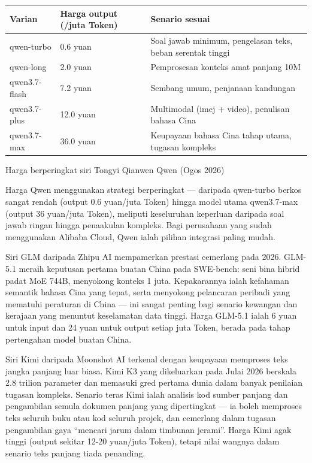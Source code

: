 \begin{center}
\begin{tabularx}{\linewidth}{|X|X|X|}
\hline
\textbf{Varian} & \textbf{Harga output (/juta Token)} & \textbf{Senario sesuai} \tabularnewline
\hline
qwen-turbo & 0.6 yuan & Soal jawab minimum, pengelasan teks, beban serentak tinggi \tabularnewline
qwen-long & 2.0 yuan & Pemprosesan konteks amat panjang 10M \tabularnewline
qwen3.7-flash & 7.2 yuan & Sembang umum, penjanaan kandungan \tabularnewline
qwen3.7-plus & 12.0 yuan & Multimodal (imej + video), penulisan bahasa Cina \tabularnewline
qwen3.7-max & 36.0 yuan & Keupayaan bahasa Cina tahap utama, tugasan kompleks \tabularnewline
\hline
\end{tabularx}
\end{center}

\begin{center}\small\color{gray}Harga berperingkat siri Tongyi Qianwen Qwen (Ogos 2026)\end{center}

Harga Qwen menggunakan strategi berperingkat — daripada qwen-turbo berkos sangat rendah (output 0.6 yuan/juta Token) hingga model utama qwen3.7-max (output 36 yuan/juta Token), meliputi keseluruhan keperluan daripada soal jawab ringan hingga penaakulan kompleks. Bagi perusahaan yang sudah menggunakan Alibaba Cloud, Qwen ialah pilihan integrasi paling mudah.


Siri GLM daripada Zhipu AI mempamerkan prestasi cemerlang pada 2026. GLM-5.1 meraih keputusan pertama buatan China pada SWE-bench: seni bina hibrid padat MoE 744B, menyokong konteks 1 juta. Kepakarannya ialah kefahaman semantik bahasa Cina yang tepat, serta menyokong pelancaran peribadi yang mematuhi peraturan di China — ini sangat penting bagi senario kewangan dan kerajaan yang menuntut keselamatan data tinggi. Harga GLM-5.1 ialah 6 yuan untuk input dan 24 yuan untuk output setiap juta Token, berada pada tahap pertengahan model buatan China.


Siri Kimi daripada Moonshot AI terkenal dengan keupayaan memproses teks jangka panjang luar biasa. Kimi K3 yang dikeluarkan pada Julai 2026 berskala 2.8 trilion parameter dan memasuki gred pertama dunia dalam banyak penilaian tugasan kompleks. Senario teras Kimi ialah analisis kod sumber panjang dan pengambilan semula dokumen panjang yang dipertingkat — ia boleh memproses teks seluruh buku atau kod seluruh projek, dan cemerlang dalam tugasan pengambilan gaya “mencari jarum dalam timbunan jerami”. Harga Kimi agak tinggi (output sekitar 12-20 yuan/juta Token), tetapi nilai wangnya dalam senario teks panjang tiada penanding.

